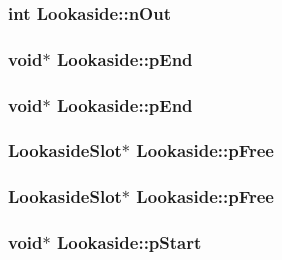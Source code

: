 \subsubsection{\setlength{\rightskip}{0pt plus 5cm}int \bf{Lookaside::n\-Out}}\label{structLookaside_28268a706912a41640c9dfbf135573e9}


\subsubsection{\setlength{\rightskip}{0pt plus 5cm}void$\ast$ \bf{Lookaside::p\-End}}\label{structLookaside_0b46e68d1d4db1c443a2383a3e31b235}


\subsubsection{\setlength{\rightskip}{0pt plus 5cm}void$\ast$ \bf{Lookaside::p\-End}}\label{structLookaside_0b46e68d1d4db1c443a2383a3e31b235}


\subsubsection{\setlength{\rightskip}{0pt plus 5cm}\bf{Lookaside\-Slot}$\ast$ \bf{Lookaside::p\-Free}}\label{structLookaside_56aff5c2d4de672803bbf7d1d2bd9fea}


\subsubsection{\setlength{\rightskip}{0pt plus 5cm}\bf{Lookaside\-Slot}$\ast$ \bf{Lookaside::p\-Free}}\label{structLookaside_56aff5c2d4de672803bbf7d1d2bd9fea}


\subsubsection{\setlength{\rightskip}{0pt plus 5cm}void$\ast$ \bf{Lookaside::p\-Start}}\label{structLookaside_910a4c95e55d966aad54f13351e0f5ff}



